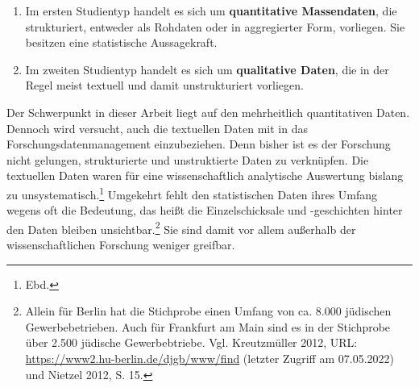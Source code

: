 \begin{enumerate}
    \item Im ersten Studientyp handelt es sich um \textbf{quantitative Massendaten}, die strukturiert, entweder als Rohdaten oder in aggregierter Form, vorliegen. Sie besitzen eine statistische Aussagekraft.
    \item Im zweiten Studientyp handelt es sich um \textbf{qualitative Daten}, die in der Regel meist textuell und damit unstrukturiert vorliegen.
\end{enumerate}

Der Schwerpunkt in dieser Arbeit liegt auf den mehrheitlich quantitativen Daten. Dennoch wird versucht, auch die textuellen Daten mit in das Forschungsdatenmanagement einzubeziehen. Denn bisher ist es der Forschung nicht gelungen, strukturierte und unstruktierte Daten zu verknüpfen. Die textuellen Daten waren für eine wissenschaftlich analytische Auswertung bislang zu unsystematisch.\footnote{Ebd.} Umgekehrt fehlt den statistischen Daten ihres Umfang wegens oft die Bedeutung, das heißt die Einzelschicksale und -geschichten hinter den Daten bleiben unsichtbar.\footnote{Allein für Berlin hat die Stichprobe einen Umfang von ca. 8.000 jüdischen Gewerbebetrieben. Auch für Frankfurt am Main sind es in der Stichprobe über 2.500 jüdische Gewerbebtriebe. Vgl. Kreutzmüller 2012, URL: \url{https://www2.hu-berlin.de/djgb/www/find} (letzter Zugriff am 07.05.2022) und Nietzel 2012, S. 15.} Sie sind damit vor allem außerhalb der wissenschaftlichen Forschung weniger greifbar.

